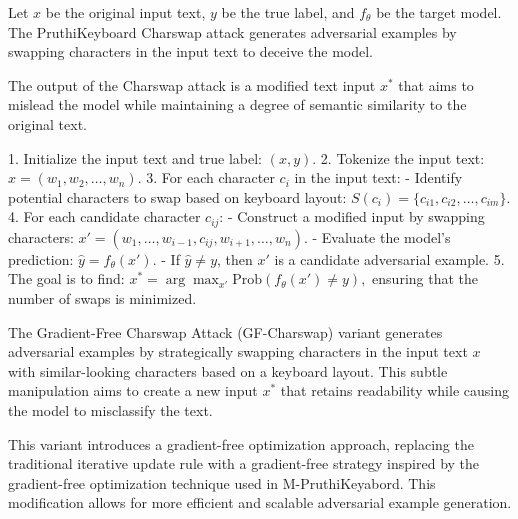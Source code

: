 Let \( x \) be the original input text, \( y \) be the true label, and \( f_{\theta} \) be the target model. The PruthiKeyboard Charswap attack generates adversarial examples by swapping characters in the input text to deceive the model.

The output of the Charswap attack is a modified text input \( x^* \) that aims to mislead the model while maintaining a degree of semantic similarity to the original text.

1. Initialize the input text and true label:
   $
   (x, y).
   $
2. Tokenize the input text:
   $
   x = (w_1, w_2, \ldots, w_n).
   $
3. For each character \( c_i \) in the input text:
   - Identify potential characters to swap based on keyboard layout:
   $
   S(c_i) = \{c_{i1}, c_{i2}, \ldots, c_{im}\}.
   $
4. For each candidate character \( c_{ij} \):
   - Construct a modified input by swapping characters:
   $
   x' = (w_1, \ldots, w_{i-1}, c_{ij}, w_{i+1}, \ldots, w_n).
   $
   - Evaluate the model's prediction:
   $
   \hat{y} = f_{\theta}(x').
   $
   - If \( \hat{y} \neq y \), then \( x' \) is a candidate adversarial example.
5. The goal is to find:
   $
   x^* = \arg\max_{x'} \text{Prob}(f_{\theta}(x') \neq y),
   $
   ensuring that the number of swaps is minimized.

The Gradient-Free Charswap Attack (GF-Charswap) variant generates adversarial examples by strategically swapping characters in the input text \( x \) with similar-looking characters based on a keyboard layout. This subtle manipulation aims to create a new input \( x^* \) that retains readability while causing the model to misclassify the text.

This variant introduces a gradient-free optimization approach, replacing the traditional iterative update rule with a gradient-free strategy inspired by the gradient-free optimization technique used in M-PruthiKeyabord. This modification allows for more efficient and scalable adversarial example generation.